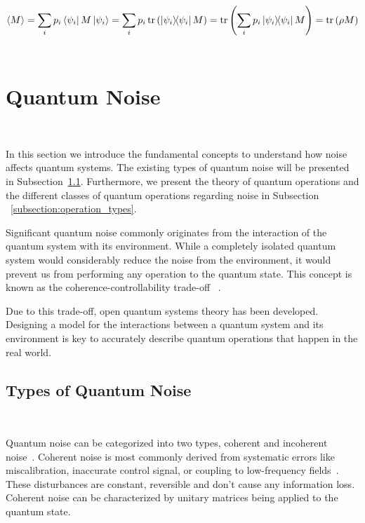\begin{equation}\label{eq:density_expectation}
  \ev{M} = \sum_{i}p_i\bra{\psi_i}M\ket{\psi_i} =
  \sum_{i}p_i\trace\left(\ketbra{\psi_i}{\psi_i}M\right) =
  \trace\left(\sum_{i}p_i\ketbra{\psi_i}{\psi_i}M\right) =
  \trace\left(\rho M\right)
\end{equation} \




\section{Quantum Noise}\label{section:noise} \

In this section we introduce the fundamental concepts to understand
how noise affects quantum systems. The existing types of quantum noise
will be presented in Subsection~\ref{subsection:noise_types}. Furthermore,
we present the theory of quantum operations and the different classes of
quantum operations regarding noise in Subsection
~\ref{subsection:operation_types}. \

Significant quantum noise commonly originates from the interaction of
the quantum system with its environment. While a completely isolated
quantum system would considerably reduce the noise from the environment,
it would prevent us from performing any operation to the quantum state.
This concept is known as the coherence-controllability trade-off
~\cite{yoneda_quantum-dot_2018}. \

Due to this trade-off, open quantum systems theory has been developed.
Designing a model for the interactions between a quantum system and
its environment is key to accurately describe quantum operations that
happen in the real world. \

\subsection{Types of Quantum Noise}\label{subsection:noise_types} \

Quantum noise can be categorized into two types, coherent and
incoherent noise~\cite{pravia_robust_2003}. Coherent noise is most commonly
derived from systematic errors like miscalibration, inaccurate
control signal, or coupling to low-frequency fields~\cite{kaufmann_characterization_2023}.
These disturbances are constant, reversible and don't cause any
information loss. Coherent noise can be characterized by unitary matrices
being applied to the quantum state. \

